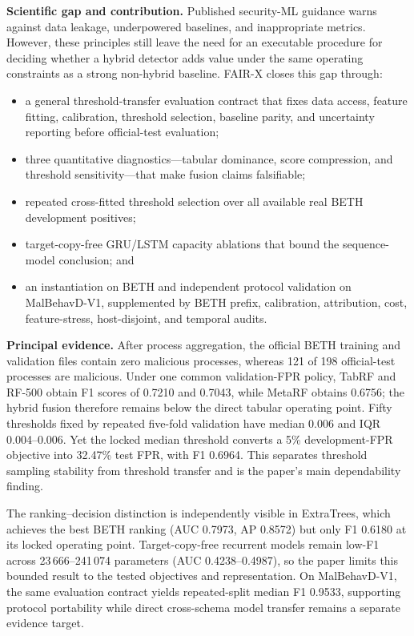 \documentclass[11pt]{article}
\begin{document}
\textbf{Scientific gap and contribution.}
Published security-ML guidance warns against data leakage, underpowered baselines, and
inappropriate metrics. However, these principles still leave the need for
an executable procedure for deciding whether a hybrid detector adds value
under the same operating constraints as a strong non-hybrid baseline.
FAIR-X closes this gap through:
\begin{itemize}
    \item a general threshold-transfer evaluation contract that fixes data access, feature fitting,
    calibration, threshold selection, baseline parity, and uncertainty
    reporting before official-test evaluation;
    \item three quantitative diagnostics---tabular dominance, score
    compression, and threshold sensitivity---that make fusion claims
    falsifiable;
    \item repeated cross-fitted threshold selection over all available real
    BETH development positives;
    \item target-copy-free GRU/LSTM capacity ablations that bound the
    sequence-model conclusion; and
    \item an instantiation on BETH and independent protocol validation on MalBehavD-V1, supplemented by
    BETH prefix, calibration, attribution, cost, feature-stress,
    host-disjoint, and temporal audits.
\end{itemize}

\newpage

\textbf{Principal evidence.}
After process aggregation, the official BETH training and validation files
contain zero malicious processes, whereas 121 of 198 official-test processes
are malicious. Under one common validation-FPR policy, TabRF and RF-500 obtain F1 scores of
0.7210 and 0.7043, while MetaRF obtains 0.6756; the hybrid fusion
therefore remains below the direct tabular operating point. Fifty thresholds fixed by
repeated five-fold validation have median 0.006 and IQR 0.004--0.006. Yet the
locked median threshold converts a 5\% development-FPR objective into 32.47\%
test FPR, with F1 0.6964. This separates threshold sampling stability from
threshold transfer and is the paper's main dependability finding.

The ranking--decision distinction is independently visible in ExtraTrees,
which achieves the best BETH ranking (AUC 0.7973, AP 0.8572) but only F1
0.6180 at its locked operating point. Target-copy-free recurrent models remain
low-F1 across 23\,666--241\,074 parameters (AUC 0.4238--0.4987), so the paper
limits this bounded result to the tested objectives and representation. On
MalBehavD-V1, the same evaluation contract yields repeated-split median F1
0.9533, supporting protocol portability while direct cross-schema model
transfer remains a separate evidence target.
\end{document}
